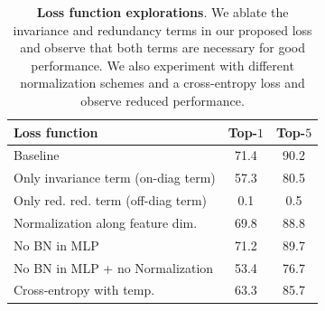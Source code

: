 

\begin{table}[ht]
\caption{\textbf{Loss function explorations}. We ablate the invariance and redundancy terms in our proposed loss and observe that both terms are necessary for good performance. We also experiment with different normalization schemes and a cross-entropy loss and observe reduced performance.}
\label{tab:abl-loss}
\vskip 0.15in
\begin{center}
\begin{tabular}{l c c}
\toprule
Loss function & Top-$1$ & Top-$5$ \\
\midrule
    Baseline & 71.4 & 90.2 \\
\midrule
    Only invariance term (on-diag term)  & 57.3 & 80.5 \\ 
    Only red. red. term (off-diag term)  & 0.1 & 0.5 \\
    \midrule
    Normalization along feature dim. & 69.8 & 88.8 \\
    No BN in MLP & 71.2 & 89.7 \\
    No BN in MLP + no Normalization & 53.4 & 76.7 \\
    \midrule
    Cross-entropy with temp. & 63.3 & 85.7 \\
\bottomrule
\end{tabular}
\end{center}
\vskip -0.1in
\end{table}

